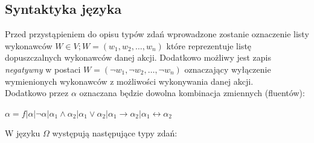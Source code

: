 \documentclass{article}
\begin{document}
\subsection{Syntaktyka języka}
Przed przystąpieniem do opisu typów zdań wprowadzone zostanie oznaczenie listy wykonawców $W \in V; W=(w_{1}, w_{2}, \dots, w_{n})$ które reprezentuje listę dopuszczalnych wykonawców danej akcji. Dodatkowo możliwy jest zapis \textit{negatywny} w postaci $W=(\neg w_{1}, \neg w_{2}, \dots, \neg w_{n})$ oznaczający wyłączenie wymienionych wykonawców z możliwości wykonywania danej akcji.\\
Dodatkowo przez $\alpha$ oznaczana będzie dowolna kombinacja zmiennych (fluentów): 
\begin{center}
$\alpha= f | \alpha | \neg\alpha | \alpha_{1} \land \alpha_{2} | \alpha_{1} \lor \alpha_{2} | \alpha_{1} \to \alpha_{2} | \alpha_{1} \leftrightarrow \alpha_{2} $
\end{center}
W języku  $\Omega$ występują następujące typy zdań:
\end{document}
